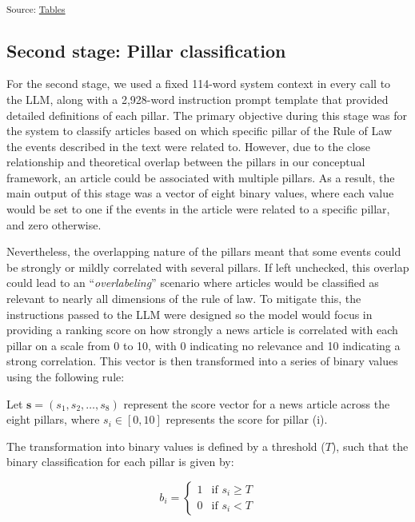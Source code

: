 \documentclass[
]{agujournal2019}
\begin{document}
\textsubscript{Source:
\href{https://ctoruno.github.io/eu-rol-tracker/notebooks/tables-preview.html\#cell-tbl-classstage1}{Tables}}

\subsection{Second stage: Pillar
classification}\label{second-stage-pillar-classification}

For the second stage, we used a fixed 114-word system context in every
call to the LLM, along with a 2,928-word instruction prompt template
that provided detailed definitions of each pillar. The primary objective
during this stage was for the system to classify articles based on which
specific pillar of the Rule of Law the events described in the text were
related to. However, due to the close relationship and theoretical
overlap between the pillars in our conceptual framework, an article
could be associated with multiple pillars. As a result, the main output
of this stage was a vector of eight binary values, where each value
would be set to one if the events in the article were related to a
specific pillar, and zero otherwise.

Nevertheless, the overlapping nature of the pillars meant that some
events could be strongly or mildly correlated with several pillars. If
left unchecked, this overlap could lead to an ``\emph{overlabeling}''
scenario where articles would be classified as relevant to nearly all
dimensions of the rule of law. To mitigate this, the instructions passed
to the LLM were designed so the model would focus in providing a ranking
score on how strongly a news article is correlated with each pillar on a
scale from 0 to 10, with 0 indicating no relevance and 10 indicating a
strong correlation. This vector is then transformed into a series of
binary values using the following rule:

Let \(\mathbf{s} = (s_1, s_2, \dots, s_8)\) represent the score vector
for a news article across the eight pillars, where \(s_i \in [0, 10]\)
represents the score for pillar (i).

The transformation into binary values is defined by a threshold (\(T\)),
such that the binary classification for each pillar is given by:

\[
b_i =
\begin{cases}
1 & \text{if } s_i \geq T \\
0 & \text{if } s_i < T
\end{cases}
\]
\end{document}
